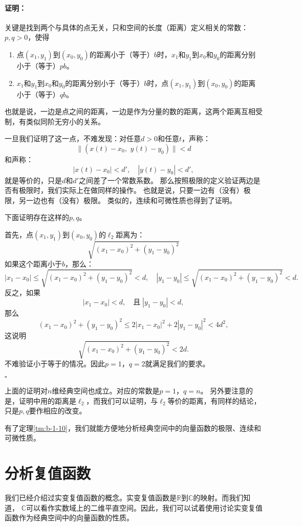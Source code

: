 \documentclass[12pt,UTF8]{ctexbook}
\theoremstyle{definition}
\theoremstyle{plain}
\renewenvironment{proof}{\paragraph{\textbf{证明：}}}{\hfill$\square$}
\begin{document}
\begin{appendix}
\begin{proof}
    关键是找到两个与具体的点无关，只和空间的长度（距离）定义相关的常数：$p,q>0$，使得
    \begin{enumerate}
        \item 点$(x_1, y_1)$到$(x_0, y_0)$的距离小于（等于）$b$时，$x_1$和$y_1$到$x_0$和$y_0$的距离分别小于（等于）$pb$。
        \item $x_1$和$y_1$到$x_0$和$y_0$的距离分别小于（等于）$b$时，点$(x_1, y_1)$到$(x_0, y_0)$的距离小于（等于）$qb$。
    \end{enumerate}
    也就是说，一边是点之间的距离，一边是作为分量的数的距离，这两个距离互相受制，有类似同阶无穷小的关系。
    
    一旦我们证明了这一点，不难发现：对任意$d>0$和任意$t$，声称：
    $$ \|(x(t) - x_0,\,\, y(t) - y_0)\| < d $$
    和声称：
    $$ |x(t) - x_0| < d' , \quad |y(t) - y_0 | < d', $$
    就是等价的，只是$d$和$d'$之间差了一个常数系数。
    那么按照极限的定义验证两边是否有极限时，我们实际上在做同样的操作。
    也就是说，只要一边有（没有）极限，另一边也有（没有）极限。
    类似的，连续和可微性质也得到了证明。

    下面证明存在这样的$p,q$。

    首先，点$(x_1, y_1)$到$(x_0, y_0)$的$\ell_2$距离为：
    $$ \sqrt{(x_1 - x_0)^2 + ( y_1 - y_0)^2} $$
    如果这个距离小于$b$，那么：
    $$ |x_1 - x_0| \leqslant \sqrt{(x_1 - x_0)^2 + ( y_1 - y_0)^2} < d, \quad |y_1 - y_0| \leqslant \sqrt{(x_1 - x_0)^2 + ( y_1 - y_0)^2} < d. $$
    反之，如果
    $$ |x_1 - x_0| < d, \quad \mbox{且}\; |y_1 - y_0| < d, $$
    那么
    $$ (x_1 - x_0)^2 + ( y_1 - y_0)^2 \leqslant 2|x_1 - x_0|^2 + 2|y_1 - y_0|^2 < 4d^2, $$
    这说明
    $$ \sqrt{(x_1 - x_0)^2 + ( y_1 - y_0)^2} < 2d. $$
    不难验证小于等于的情况。因此$p = 1$，$q = 2$就满足我们的要求。

\end{proof}

上面的证明对$n$维经典空间也成立。对应的常数是$p = 1$，$q = n$。
另外要注意的是，证明中用的距离是$\ell_2$，而我们可以证明，与$\ell_2$等价的距离，有同样的结论，只是$p,q$要作相应的改变。

有了定理\ref{tm:b-1-10}，我们就能方便地分析经典空间中的向量函数的极限、连续和可微性质。

\section{分析复值函数}

我们已经介绍过实变复值函数的概念。实变复值函数是$\mathbb{R}$到$\mathbb{C}$的映射。而我们知道，
$\mathbb{C}$可以看作实数域上的二维平直空间。因此，我们可以试着使用讨论实变复值函数作为经典空间中的向量函数的性质。


\end{appendix}
\end{document}
